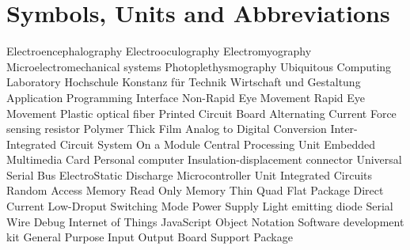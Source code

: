 \chapter*{Symbols, Units and Abbreviations}

\begin{acronym}
   {Electroencephalography}
   {Electrooculography}
   {Electromyography}
   {Microelectromechanical systems}
   {Photoplethysmography}
   {Ubiquitous Computing Laboratory}
   {Hochschule Konstanz f\"ur Technik Wirtschaft und Gestaltung}
   {Application Programming Interface}
   {Non-Rapid Eye Movement}
   {Rapid Eye Movement}
   {Plastic optical fiber}
   {Printed Circuit Board}
   {Alternating Current}
   {Force sensing resistor}
   {Polymer Thick Film}
   {Analog to Digital Conversion}
   {Inter-Integrated Circuit}
   {System On a Module}
   {Central Processing Unit}
   {Embedded Multimedia Card}
   {Personal computer}
   {Insulation-displacement connector}
   {Universal Serial Bus}
   {ElectroStatic Discharge}
   {Microcontroller Unit}
   {Integrated Circuits}
   {Random Access Memory}
   {Read Only Memory}
   {Thin Quad Flat Package}
   {Direct Current}
   {Low-Droput}
   {Switching Mode Power Supply}
   {Light emitting diode}
   {Serial Wire Debug}
   {Internet of Things}
   {JavaScript Object Notation}
   {Software development kit}
   {General Purpose Input Output}
   {Board Support Package}
\end{acronym}

\newpage